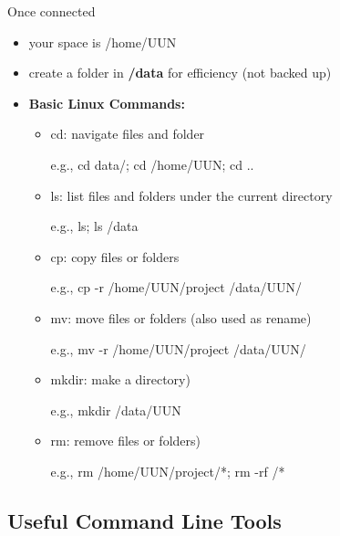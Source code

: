 \documentclass[10pt]{beamer}
\begin{document}
\begin{frame}[fragile]{Once connected}

\begin{itemize}
    \item your space is /home/UUN
    \item create a folder in \textbf{/data} for efficiency (not backed up)
    \newline
    \item{
    \textbf{Basic Linux Commands: }
    \begin{itemize}
        \item {cd: navigate files and folder
        
        \quad e.g., cd data/; cd /home/UUN; cd ..}
        \item {ls: list files and folders under the current directory
        
        \quad e.g., ls; ls /data}
        \item {cp: copy files or folders
        
        \quad e.g., cp -r /home/UUN/project /data/UUN/}
        \item {mv: move files or folders (also used as rename)
        
        \quad e.g., mv -r /home/UUN/project /data/UUN/}
        \item {mkdir: make a directory)
        
        \quad e.g., mkdir /data/UUN}
        \item {rm: remove files or folders)
        
        \quad e.g., rm /home/UUN/project/*; rm -rf /*}
    \end{itemize}
    }
\end{itemize}

\end{frame}

\subsection{Useful Command Line Tools}
\end{document}
